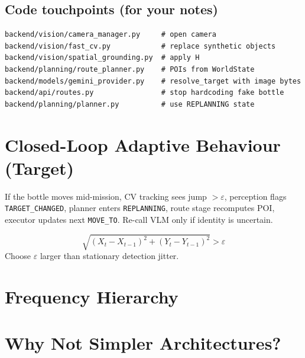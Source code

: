 \documentclass[11pt,a4paper]{article}
\begin{document}
\subsection*{Code touchpoints (for your notes)}
\begin{verbatim}
backend/vision/camera_manager.py     # open camera
backend/vision/fast_cv.py            # replace synthetic objects
backend/vision/spatial_grounding.py  # apply H
backend/planning/route_planner.py    # POIs from WorldState
backend/models/gemini_provider.py    # resolve_target with image bytes
backend/api/routes.py                # stop hardcoding fake bottle
backend/planning/planner.py          # use REPLANNING state
\end{verbatim}

\section{Closed-Loop Adaptive Behaviour (Target)}

If the bottle moves mid-mission, CV tracking sees jump $> \varepsilon$, perception flags
\texttt{TARGET\_CHANGED}, planner enters \texttt{REPLANNING}, route stage recomputes POI,
executor updates next \texttt{MOVE\_TO}. Re-call VLM only if identity is uncertain.

\begin{mathbox}[title={\textbf{Replan threshold}}]
\[
\sqrt{(X_t - X_{t-1})^2 + (Y_t - Y_{t-1})^2} > \varepsilon
\]
Choose $\varepsilon$ larger than stationary detection jitter.
\end{mathbox}

\section{Frequency Hierarchy}

\begin{center}
\end{center}

\section{Why Not Simpler Architectures?}
\end{document}
